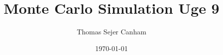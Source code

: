 \documentclass{article}
\title{Monte Carlo Simulation Uge 9}
\author{Thomas Sejer Canham}
\date{\today}
\theoremstyle{definition}
\theoremstyle{remark}
\begin{document}

\begin{titlepage}

    \maketitle
    \thispagestyle{empty}

\end{titlepage}
\end{document}
